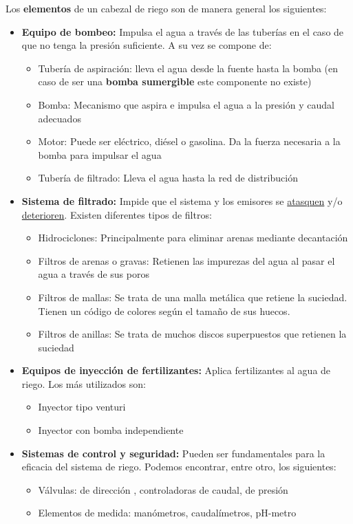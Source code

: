 \documentclass[a4paper,12pt,oneside]{article}
\begin{document}
\begin{enumerate}
Los \textbf{elementos} de un cabezal de riego son de manera general los siguientes:\\
\begin{itemize}
\item \textbf{Equipo de bombeo:} Impulsa el agua a través de las tuberías en el caso de
que no tenga la presión suficiente. A su vez se compone de:
\begin{itemize}
\item Tubería de aspiración: lleva el agua desde la fuente hasta la bomba (en
caso de ser una \textbf{bomba sumergible} este componente no existe)
\item Bomba: Mecanismo que aspira e impulsa el agua a la presión y caudal adecuados
\item Motor: Puede ser eléctrico, diésel o gasolina. Da la fuerza necesaria a la
bomba para impulsar el agua
\item Tubería de filtrado: Lleva el agua hasta la red de distribución
\end{itemize}
\item \textbf{Sistema de filtrado:} Impide que el sistema y los emisores se \uline{atasquen} y/o
\uline{deterioren}. Existen diferentes tipos de filtros:
\begin{itemize}
\item Hidrociclones: Principalmente para eliminar arenas mediante decantación
\item Filtros de arenas o gravas: Retienen las impurezas del agua al pasar el
agua a través de sus poros
\item Filtros de mallas: Se trata de una malla metálica que retiene la
suciedad. Tienen un código de colores según el tamaño de sus huecos.
\item Filtros de anillas:  Se trata de muchos discos superpuestos que retienen
la suciedad
\end{itemize}
\item \textbf{Equipos de inyección de fertilizantes:} Aplica fertilizantes al agua de
riego. Los más utilizados son:
\begin{itemize}
\item Inyector tipo venturi
\item Inyector con bomba independiente
\end{itemize}
\item \textbf{Sistemas de control y seguridad:} Pueden ser fundamentales para la eficacia
del sistema de riego. Podemos encontrar, entre otro, los siguientes:
\begin{itemize}
\item Válvulas: de dirección , controladoras de caudal, de presión
\item Elementos de medida: manómetros, caudalímetros, pH-metro
\end{itemize}
\end{itemize}


\end{enumerate}
\end{document}
